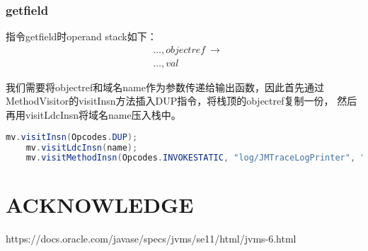 \documentclass[UTF8]{article}
\begin{document}
\subsubsection{getfield}
指令getfield时operand stack如下：
\begin{equation*}
    \begin{split}
        &\ldots, objectref\ \rightarrow\\
        &\ldots, val
    \end{split}
\end{equation*}

我们需要将objectref和域名name作为参数传递给输出函数，因此首先通过MethodVisitor的visitInsn方法插入DUP指令，将栈顶的objectref复制一份，
然后再用visitLdcInsn将域名name压入栈中。
\begin{lstlisting}[language=Java]
    mv.visitInsn(Opcodes.DUP);
    mv.visitLdcInsn(name);
    mv.visitMethodInsn(Opcodes.INVOKESTATIC, "log/JMTraceLogPrinter", "getLogPrint", "(Ljava/lang/Object;Ljava/lang/String;)V", false);
\end{lstlisting}



\section{ACKNOWLEDGE}
https://docs.oracle.com/javase/specs/jvms/se11/html/jvms-6.html
\end{document}
